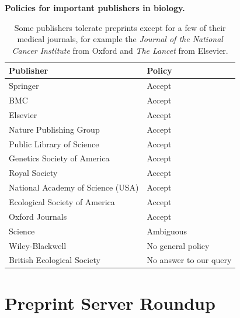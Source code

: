 \documentclass[letterpaper]{article}
\begin{document}
\begin{table}[!ht]
  \caption{\bf{Policies for important publishers in biology.}}
  \begin{tabular}{|ll|}
  \hline
  Publisher                             & Policy \\
  \hline
  Springer                              & Accept \\
  BMC                                   & Accept \\
  Elsevier                              & Accept \\
  Nature Publishing Group               & Accept \\
  Public Library of Science             & Accept \\
  Genetics Society of America           & Accept \\
  Royal Society                         & Accept \\
  National Academy of Science (USA)     & Accept \\
  Ecological Society of America         & Accept \\
  Oxford Journals                       & Accept \\
  Science                               & Ambiguous \\
  Wiley-Blackwell                       & No general policy \\
  British Ecological Society            & No answer to our query \\
  \hline
  \end{tabular}
  \caption{Some publishers tolerate preprints except for a few of their medical
journals, for example the \emph{ Journal of the National Cancer Institute}
from Oxford and \emph{The Lancet} from Elsevier.}
  \label{table:policies}
\end{table}

\section{Preprint Server Roundup}
\end{document}
